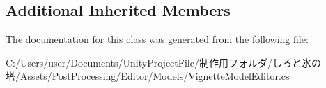 \subsection*{Additional Inherited Members}


The documentation for this class was generated from the following file\+:\begin{DoxyCompactItemize}
\item 
C\+:/\+Users/user/\+Documents/\+Unity\+Project\+File/制作用フォルダ/しろと氷の塔/\+Assets/\+Post\+Processing/\+Editor/\+Models/Vignette\+Model\+Editor.\+cs\end{DoxyCompactItemize}
